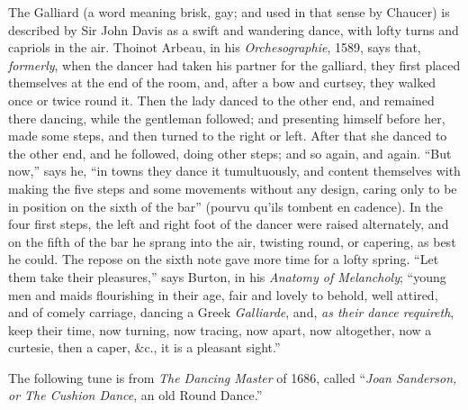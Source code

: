The Galliard (a word meaning brisk, gay; and used in that sense by Chaucer)
is described by Sir John Davis as a swift and wandering dance, with lofty turns
and capriols in the air. Thoinot Arbeau, in his \textit{Orchesographie}, 1589, says that,
\textit{formerly}, when the dancer had taken his partner for the galliard, they first placed 
themselves at the end of the room, and, \pagebreak after a bow and curtsey, they walked once
or twice round it. Then the lady danced to the other end, and remained there
dancing, while the gentleman followed; and presenting himself before her, made
some steps, and then turned to the right or left. After that she danced to the
other end, and he followed, doing other steps; and so again, and again. “But
now,” says he, “in towns they dance it tumultuously, and content themselves
with making the five steps and some movements without any design, caring only
to be in position on the sixth of the bar” (pourvu qu’ils tombent en cadence).
In the four first steps, the left and right foot of the dancer were raised alternately,
and on the fifth of the bar he sprang into the air, twisting round, or capering, as
best he could. The repose on the sixth note gave more time for a lofty spring.
“Let them take their pleasures,” says Burton, in his \textit{Anatomy of Melancholy};
“young men and maids flourishing in their age, fair and lovely to behold, well
attired, and of comely carriage, dancing a Greek \textit{Galliarde}, and, \textit{as their dance
requireth}, keep their time, now turning, now tracing, now apart, now altogether,
now a curtesie, then a caper, \&c., it is a pleasant sight.”

The following tune is from \textit{The Dancing Master} of 1686, called “\textit{Joan Sanderson,
or The Cushion Dance}, an old Round Dance.”


\pagebreak

